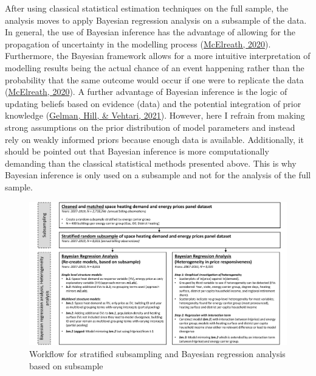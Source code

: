 \documentclass[12pt,twoside]{reedthesis}
\begin{document}
After using classical statistical estimation techniques on the full sample, the analysis moves to apply Bayesian regression analysis on a subsample of the data. In general, the use of Bayesian inference has the advantage of allowing for the propagation of uncertainty in the modelling process (\protect\hyperlink{ref-mcelreath20}{McElreath, 2020}). Furthermore, the Bayesian framework allows for a more intuitive interpretation of modelling results being the actual chance of an event happening rather than the probability that the same outcome would occur if one were to replicate the data (\protect\hyperlink{ref-mcelreath20}{McElreath, 2020}). A further advantage of Bayesian inference is the logic of updating beliefs based on evidence (data) and the potential integration of prior knowledge (\protect\hyperlink{ref-gelman_etal21}{Gelman, Hill, \& Vehtari, 2021}). However, here I refrain from making strong assumptions on the prior distribution of model parameters and instead rely on weakly informed priors because enough data is available. Additionally, it should be pointed out that Bayesian inference is more computationally demanding than the classical statistical methods presented above. This is why Bayesian inference is only used on a subsample and not for the analysis of the full sample.
\begin{figure}

{\centering \includegraphics[width=1.03\linewidth]{figure/workflow_diagramm_part2} 

}

\caption{Workflow for stratified subsampling and Bayesian regression analysis based on subsample}\label{fig:workflow2}
\end{figure}
\end{document}
